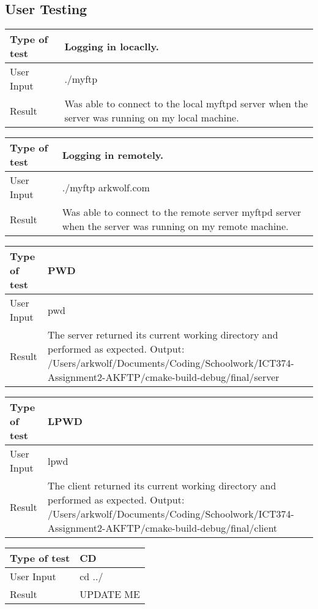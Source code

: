 \documentclass{article}
\begin{document}
\subsection{User Testing}
    \begin{tabulary}{1.0\textwidth}{|L|L|}
    \hline Type of test & Logging in locaclly.\\
    \hline User Input & ./myftp \\
    \hline Result & Was able to connect to the local myftpd server when the server was running on my local machine.\\
    \hline
    \end{tabulary}
    \newline
    \begin{tabulary}{1.0\textwidth}{|L|L|}
    \hline Type of test & Logging in remotely.\\
    \hline User Input & ./myftp arkwolf.com\\
    \hline Result & Was able to connect to the remote server myftpd server when the server was running on my remote machine.\\
    \hline
    \end{tabulary}
    \newline
    \begin{tabulary}{1.0\textwidth}{|L|L|}
    \hline Type of test & PWD\\
    \hline User Input & pwd\\
    \hline Result & The server returned its current working directory and performed as expected. Output: /Users/arkwolf/Documents/Coding/Schoolwork/ICT374-Assignment2-AKFTP/cmake-build-debug/final/server\\
    \hline
    \end{tabulary}
    \newline
    \begin{tabulary}{1.0\textwidth}{|L|L|}
    \hline Type of test & LPWD\\
    \hline User Input & lpwd\\
    \hline Result & The client returned its current working directory and performed as expected. Output: /Users/arkwolf/Documents/Coding/Schoolwork/ICT374-Assignment2-AKFTP/cmake-build-debug/final/client\\
    \hline
    \end{tabulary}
    \newline
    \begin{tabulary}{1.0\textwidth}{|L|L|}
    \hline Type of test & CD\\
    \hline User Input & cd ../\\
    \hline Result & UPDATE ME\\
    \hline
    \end{tabulary}
\end{document}
